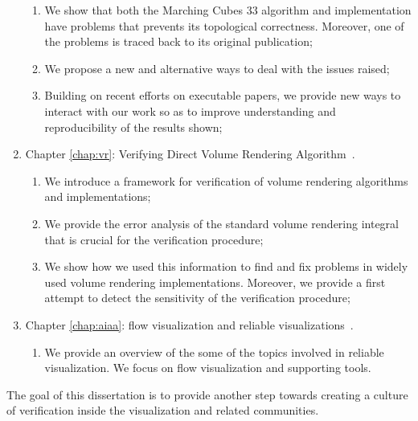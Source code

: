 \begin{enumerate}[topsep=0px,partopsep=0px,itemsep=0px,parsep=0px]
\begin{enumerate}[topsep=0px,partopsep=0px,itemsep=0px,parsep=0px]
\item We show that both the Marching Cubes 33 algorithm and implementation have problems that prevents its topological correctness. Moreover, one of the problems is traced back to its original publication;
\item We propose a new and alternative ways to deal with the issues raised;
\item Building on recent efforts on executable papers, we provide new ways to interact with our work so as to improve understanding and reproducibility of the results shown;
\end{enumerate}
\item Chapter \ref{chap:vr}: Verifying Direct Volume Rendering Algorithm~\cite{Etiene:2013}.
\begin{enumerate}[topsep=0px,partopsep=0px,itemsep=0px,parsep=0px]
\item We introduce a framework for verification of volume rendering algorithms and implementations;
\item We provide the error analysis of the standard volume rendering integral that is crucial for the verification procedure;
\item We show how we used this information to find and fix problems in widely used volume rendering  implementations. Moreover, we provide a first attempt to detect the sensitivity of the verification procedure;
\end{enumerate}
\item Chapter \ref{chap:aiaa}: flow visualization and reliable visualizations~\cite{Etiene:Flow:2013}.
\begin{enumerate}[topsep=0px,partopsep=0px,itemsep=0px,parsep=0px]
\item We provide an overview of the some of the topics involved in reliable visualization. We focus on flow visualization and supporting tools.
\end{enumerate}
\end{enumerate}
The goal of this dissertation is to provide another step towards creating a culture of verification inside the visualization and related communities.

